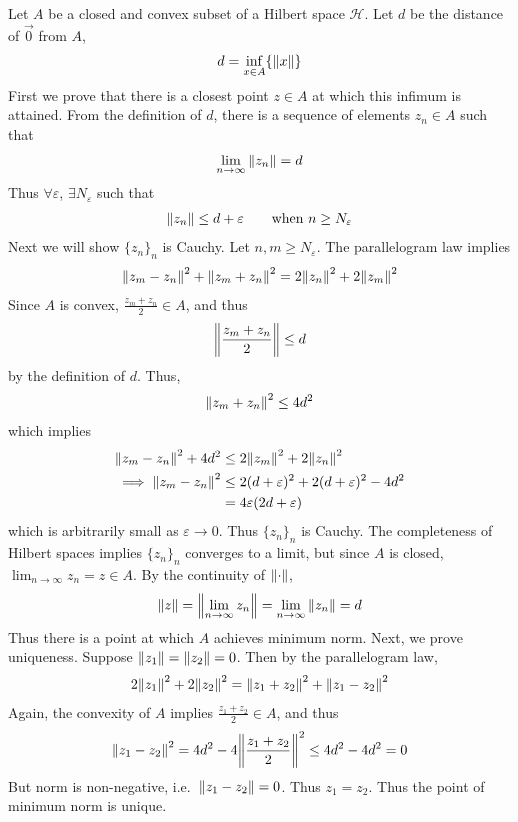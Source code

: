 \documentclass[12pt]{article}
\newcommand{\E}{\varepsilon}
\theoremstyle{plain}
\begin{document}
Let $A$ be a closed and convex subset of a Hilbert space $\mathcal{H}$.  Let $d$ be the distance of $\vec{0}$ from $A$,
\begin{align*}
    d = \inf_{x \in A}\{\norm{x}\}
\end{align*}
First we prove that there is a closest point $z \in A$ at which this infimum is attained.  From the definition of $d$, there is a sequence of elements $z_n \in A$ such that
\begin{align*}
    \lim_{n\rightarrow \infty}\norm{z_n} = d
\end{align*}
Thus $\forall \E$, $\exists N_\E$ such that
\begin{align*}
    \norm{z_n} \leq d + \E\ \ \ \ \ \text{ when } n \geq N_\E
\end{align*}
Next we will show $\{z_n\}_n$ is Cauchy.  Let $n,m \geq N_\E$.  The parallelogram law implies
\begin{align*}
    \norm{z_m - z_n}^2 + \norm{z_m + z_n}^2 = 2\norm{z_n}^2 + 2\norm{z_m}^2
\end{align*}
Since $A$ is convex, $\frac{z_m + z_n}{2} \in A$, and thus
\begin{align*}
    \norm{\frac{z_m + z_n}{2}} \leq d
\end{align*}
by the definition of $d$.  Thus,
\begin{align*}
    \norm{z_m + z_n}^2 \leq 4d^2
\end{align*}
which implies
\begin{align*}
    \norm{z_m - z_n}^2 + 4d^2 &\leq 2\norm{z_m}^2 + 2\norm{z_n}^2 \\
    \implies \norm{z_m - z_n}^2 &\leq 2(d + \E)^2 + 2(d + \E)^2 - 4d^2 \\
    &= 4\E(2d + \E)
\end{align*}
which is arbitrarily small as $\E \rightarrow 0$.  Thus $\{z_n\}_n$ is Cauchy.  The completeness of Hilbert spaces implies $\{z_n\}_n$ converges to a limit, but since $A$ is closed, $\lim_{n \rightarrow \infty} z_n = z \in A$.  By the continuity of $\norm{\cdot}$,
\begin{align*}
    \norm{z} = \norm{\lim_{n\rightarrow\infty}z_n} = \lim_{n\rightarrow\infty}\norm{z_n} = d
\end{align*}
Thus there is a point at which $A$ achieves minimum norm.  Next, we prove uniqueness.  Suppose $\norm{z_1} = \norm{z_2} = 0$.  Then by the parallelogram law,
\begin{align*}
    2\norm{z_1}^2 + 2\norm{z_2}^2 = \norm{z_1 + z_2}^2 + \norm{z_1 - z_2}^2
\end{align*}
Again, the convexity of $A$ implies $\frac{z_1 + z_2}{2} \in A$, and thus
\begin{align*}
    \norm{z_1 - z_2}^2 = 4d^2 - 4\norm{\frac{z_1 + z_2}{2}}^2 \leq 4d^2 - 4d^2 = 0
\end{align*}
But norm is non-negative, i.e.~$\norm{z_1 - z_2} = 0$.  Thus $z_1 = z_2$.  Thus the point of minimum norm is unique.
\end{document}
